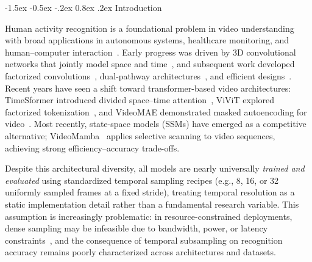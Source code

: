 \documentclass[runningheads]{llncs}
\makeatletter
\renewcommand\section{\@startsection{section}{1}{\z@}%
                       {-1.5ex \@plus -0.5ex \@minus -.2ex}%
                       {0.8ex \@plus .2ex}%
                       {\normalfont\large\bfseries\boldmath}}
\makeatother
\begin{document}

\section{Introduction}
\label{sec:intro}

Human activity recognition is a foundational problem in video understanding
with broad applications in autonomous systems, healthcare monitoring, and
human--computer interaction~\cite{5771372,10484402}.
Early progress was driven by 3D convolutional networks that jointly model space
and time~\cite{tran2015c3d,carreira2017i3d}, and subsequent work developed
factorized convolutions~\cite{tran2018r2plus1d,tran2019video}, dual-pathway
architectures~\cite{feichtenhofer2019slowfast}, and efficient designs~\cite{feichtenhofer2020x3d}.
Recent years have seen a shift toward transformer-based video architectures:
TimeSformer introduced divided space--time attention~\cite{bertasius2021timesformer},
ViViT explored factorized tokenization~\cite{arnab2021vivit}, and VideoMAE
demonstrated masked autoencoding for video~\cite{tong2022videomae}.
Most recently, state-space models (SSMs) have emerged as a competitive
alternative; VideoMamba~\cite{li2024videomamba} applies selective scanning to
video sequences, achieving strong efficiency--accuracy trade-offs.

Despite this architectural diversity, all models are nearly universally
\emph{trained and evaluated} using standardized temporal sampling recipes
(e.g., 8, 16, or 32 uniformly sampled frames at a fixed stride), treating
temporal resolution as a static implementation detail rather than a fundamental
research variable.
This assumption is increasingly problematic: in resource-constrained deployments,
dense sampling may be infeasible due to bandwidth, power, or latency
constraints~\cite{lin2019tsm}, and the consequence of temporal subsampling on
recognition accuracy remains poorly characterized across architectures and datasets.
\end{document}
